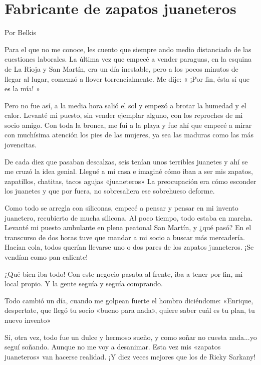 \documentclass[11pt,twoside,openright,a5paper]{book}
\begin{document}
\section*{Fabricante de zapatos juaneteros}

                                                             \begin{flushright}Por Belkis\end{flushright}

Para el que no me conoce, les cuento que siempre ando medio distanciado de las cuestiones laborales. La última vez que empecé a vender paraguas, en la esquina de La Rioja y San Martín, era un día inestable, pero a los pocos minutos de llegar al lugar, comenzó a llover torrencialmente. Me dije: « ¡Por fin, ésta sí que es la mía! »

Pero no fue así, a la media hora salió el sol y empezó a brotar la humedad y el calor. Levanté mi puesto, sin vender ejemplar alguno, con los reproches de mi socio amigo. Con toda la bronca, me fui a la playa y fue ahí que empecé a mirar con muchísima atención los pies de las mujeres, ya sea las maduras como las más jovencitas.

De cada diez que pasaban descalzas, seis tenían unos terribles juanetes y ahí se me cruzó la idea genial. Llegué a mi casa e imaginé cómo iban a ser mis zapatos, zapatillos, chatitas, tacos agujas «juaneteros» La preocupación era cómo esconder los juanetes y que por fuera, no sobresaliera ese sobrehueso deforme. 

Como todo se arregla con siliconas, empecé a pensar y pensar en mi invento juanetero, recubierto de mucha silicona. Al poco tiempo, todo estaba en marcha. Levanté mi puesto ambulante en plena peatonal San Martín, y ¿qué pasó? En el transcurso de dos horas tuve que mandar a mi socio a buscar más mercadería. Hacían cola, todos querían llevarse uno o dos pares de los zapatos juaneteros. ¡Se vendían como pan caliente!

¿Qué bien iba todo! Con este negocio pasaba al frente, iba a tener por fin, mi local propio. Y la gente seguía y seguía comprando.

Todo cambió un día, cuando me golpean fuerte el hombro diciéndome: «Enrique, despertate, que llegó tu socio «bueno para nada», quiere saber cuál es tu plan, tu nuevo invento»

Sí, otra vez,  todo fue un dulce y hermoso sueño, y como soñar no cuesta nada...yo seguí soñando. Aunque no me voy a desanimar. Esta vez mis «zapatos juaneteros» van hacerse realidad. ¡Y  diez veces mejores que los de Ricky Sarkany!
\end{document}
